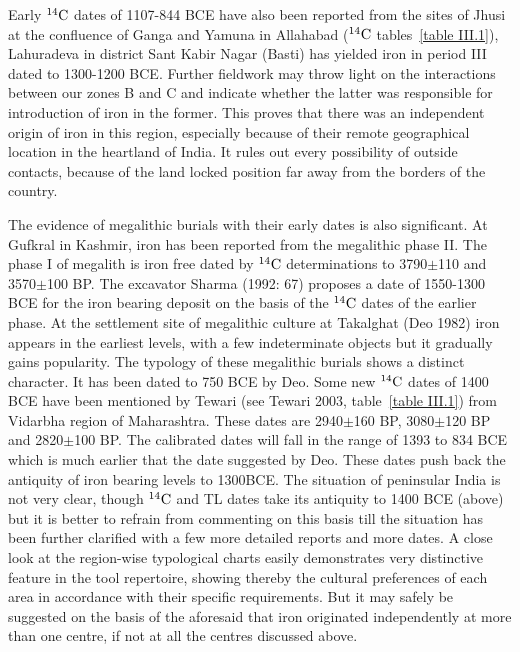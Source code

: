 Early $^{14}{\rm C}$ dates of 1107-844 BCE have also been reported from the sites of Jhusi at the confluence of Ganga and Yamuna in Allahabad ($^{14}{\rm C}$ tables~\ref{table III.1}), Lahuradeva in district Sant Kabir Nagar (Basti) has yielded iron in period III dated to 1300-1200 BCE. Further fieldwork may throw light on the interactions between our zones B and C and indicate whether the latter was responsible for introduction of iron in the former. This proves that there was an independent origin of iron in this region, especially because of their remote geographical location in the heartland of India. It rules out every possibility of outside contacts, because of the land locked position far away from the borders of the country.

The evidence of megalithic burials with their early dates is also significant. At Gufkral in Kashmir, iron has been reported from the megalithic phase II. The phase I of megalith is iron free dated by $^{14}{\rm C}$ determinations to 3790$\pm$110 and 3570$\pm$100 BP. The excavator Sharma (1992: 67) proposes a date of 1550-1300 BCE for the iron bearing deposit on the basis of the $^{14}{\rm C}$ dates of the earlier phase. At the settlement site of megalithic culture at Takalghat (Deo 1982) iron appears in the earliest levels, with a few indeterminate objects but it gradually gains popularity. The typology of these megalithic burials shows a distinct character. It has been dated to 750 BCE by Deo. Some new $^{14}{\rm C}$ dates of 1400 BCE have been mentioned by Tewari (see Tewari 2003, table~\ref{table III.1}) from Vidarbha region of Maharashtra. These dates are 2940$\pm$160 BP, 3080$\pm$120 BP and 2820$\pm$100 BP. The calibrated dates will fall in the range of 1393 to 834 BCE which is much earlier that the date suggested by Deo. These dates push back the antiquity of iron bearing levels to 1300BCE. The situation of peninsular India is not very clear, though $^{14}{\rm C}$ and TL dates take its antiquity to 1400 BCE (above) but it is better to refrain from commenting on this basis till the situation has been further clarified with a few more detailed reports and more dates. A close look at the region-wise typological charts easily demonstrates very distinctive feature in the tool repertoire, showing thereby the cultural preferences of each area in accordance with their specific requirements. But it may safely be suggested on the basis of the aforesaid that iron originated independently at more than one centre, if not at all the centres discussed above.

